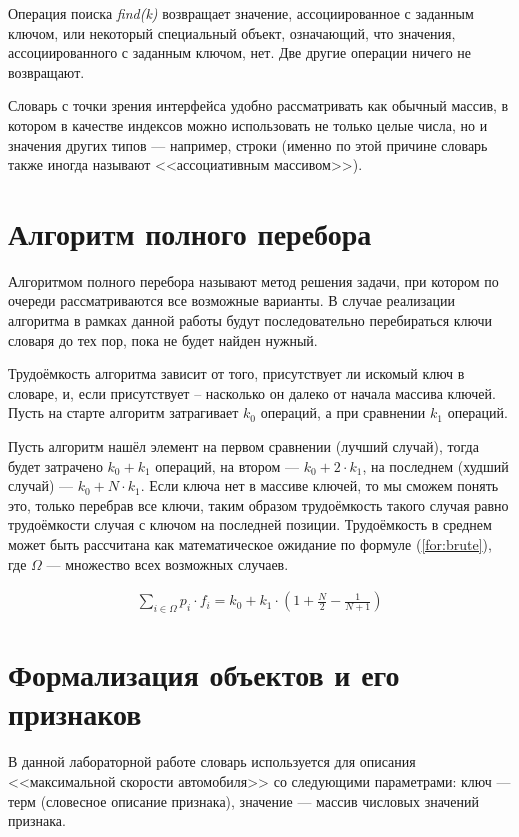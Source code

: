Операция поиска \textit{find(k)} возвращает значение, ассоциированное с заданным ключом, или некоторый специальный объект, означающий, что значения, ассоциированного с заданным ключом, нет. Две другие операции ничего не возвращают.

Словарь с точки зрения интерфейса удобно рассматривать как обычный массив, в котором в качестве индексов можно использовать не только целые числа, но и значения других типов --- например, строки (именно по этой причине словарь также иногда называют <<ассоциативным массивом>>).

\section{Алгоритм полного перебора}
Алгоритмом полного перебора называют метод решения задачи, при котором по очереди рассматриваются все возможные варианты. В случае реализации алгоритма в рамках данной работы будут последовательно перебираться ключи словаря до тех пор, пока не будет найден нужный.

Трудоёмкость алгоритма зависит от того, присутствует ли искомый ключ в словаре, и, если присутствует -- насколько он далеко от начала массива ключей.
Пусть на старте алгоритм затрагивает $k_{0}$ операций, а при сравнении $k_{1}$ операций.

Пусть алгоритм нашёл элемент на первом сравнении (лучший случай), тогда будет затрачено $k_0 + k_1$ операций, на втором --- $k_0 + 2 \cdot k_1$, на последнем (худший случай) --- $k_0 + N \cdot k_1$. Если ключа нет в массиве ключей, то мы сможем понять это, только перебрав все ключи, таким образом трудоёмкость такого случая равно трудоёмкости случая с ключом на последней позиции. Трудоёмкость в среднем может быть рассчитана как математическое ожидание по формуле (\ref{for:brute}), где $\Omega$ --- множество всех возможных случаев.

\begin{equation}
	\label{for:brute}
	\begin{aligned}
		\sum\limits_{i \in \Omega} p_i \cdot f_i = k_0 + k_1 \cdot \left(1 + \frac{N}{2} - \frac{1}{N + 1}\right)
	\end{aligned}
\end{equation}

\section{Формализация объектов и его признаков}

В данной лабораторной работе словарь используется для описания <<максимальной скорости автомобиля>> со следующими параметрами: ключ --- терм (словесное описание признака), значение --- массив числовых значений признака.

